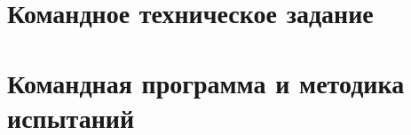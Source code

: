 \documentclass[a4paper,12pt]{report}
\begin{document}
  \singleCRTpreamble

  \CRTincludeTZ
  \chapter{Командное техническое задание}
  

  \CRTincludePZ
  \CRTincludeRP

  \CRTincludePMI
  \chapter{Командная программа и методика испытаний}
  
\end{document}
